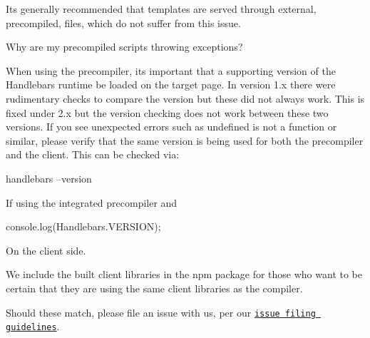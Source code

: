 It\textquotesingle{}s generally recommended that templates are served through external, precompiled, files, which do not suffer from this issue.


\begin{DoxyEnumerate}
\item Why are my precompiled scripts throwing exceptions?

When using the precompiler, it\textquotesingle{}s important that a supporting version of the Handlebars runtime be loaded on the target page. In version 1.\+x there were rudimentary checks to compare the version but these did not always work. This is fixed under 2.\+x but the version checking does not work between these two versions. If you see unexpected errors such as {\ttfamily undefined is not a function} or similar, please verify that the same version is being used for both the precompiler and the client. This can be checked via\+:
\end{DoxyEnumerate}


\begin{DoxyCode}
handlebars --version
\end{DoxyCode}
 If using the integrated precompiler and


\begin{DoxyCode}
console.log(Handlebars.VERSION);
\end{DoxyCode}
 On the client side.

We include the built client libraries in the npm package for those who want to be certain that they are using the same client libraries as the compiler.

Should these match, please file an issue with us, per our \href{https://github.com/wycats/handlebars.js/blob/master/CONTRIBUTING.md#reporting-issues}{\tt issue filing guidelines}.


